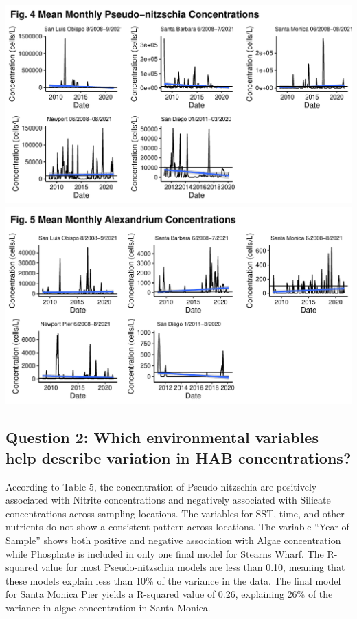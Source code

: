 \documentclass[
  12pt,
]{article}
\begin{document}
\includegraphics{Habs_Final_Report_files/figure-latex/combining figures-1.pdf}
\includegraphics{Habs_Final_Report_files/figure-latex/combining figures-2.pdf}

\newpage

\hypertarget{question-2-which-environmental-variables-help-describe-variation-in-hab-concentrations}{%
\subsection{Question 2: Which environmental variables help describe
variation in HAB
concentrations?}\label{question-2-which-environmental-variables-help-describe-variation-in-hab-concentrations}}

According to Table 5, the concentration of Pseudo-nitzschia are
positively associated with Nitrite concentrations and negatively
associated with Silicate concentrations across sampling locations. The
variables for SST, time, and other nutrients do not show a consistent
pattern across locations. The variable ``Year of Sample'' shows both
positive and negative association with Algae concentration while
Phosphate is included in only one final model for Stearns Wharf. The
R-squared value for most Pseudo-nitzschia models are less than 0.10,
meaning that these models explain less than 10\% of the variance in the
data. The final model for Santa Monica Pier yields a R-squared value of
0.26, explaining 26\% of the variance in algae concentration in Santa
Monica.
\end{document}
